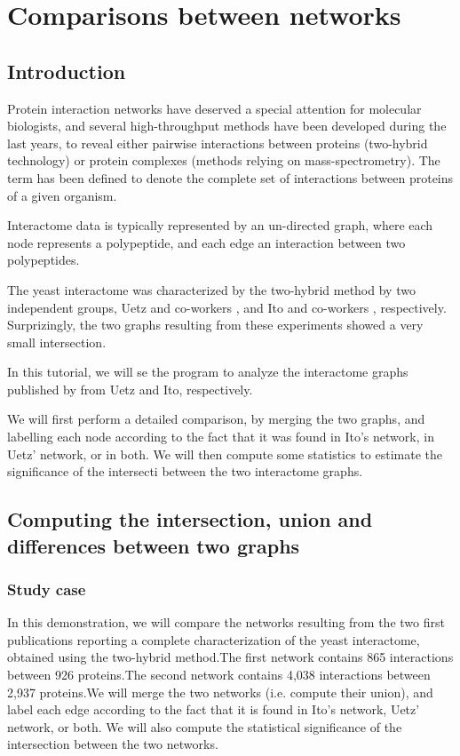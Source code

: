 \chapter{Comparisons between networks}

\section{Introduction}

Protein interaction networks have deserved a special attention for
molecular biologists, and several high-throughput methods have been
developed during the last years, to reveal either pairwise
interactions between proteins (two-hybrid technology) or protein
complexes (methods relying on mass-spectrometry). The term
 has been defined to denote the complete set of
interactions between proteins of a given organism.

Interactome data is typically represented by an un-directed graph,
where each node represents a polypeptide, and each edge an interaction
between two polypeptides.

The yeast interactome was characterized by the two-hybrid method by
two independent groups, Uetz and co-workers \cite{Uetz:2000}, and Ito
and co-workers \cite{Ito:2001}, respectively. Surprizingly, the two
graphs resulting from these experiments showed a very small
intersection.

In this tutorial, we will se the program  to
analyze the interactome graphs published by from Uetz and Ito,
respectively.

We will first perform a detailed comparison, by merging the two
graphs, and labelling each node according to the fact that it was
found in Ito's network, in Uetz' network, or in both. We will then
compute some statistics to estimate the significance of the intersecti
between the two interactome graphs.

\section{Computing the intersection, union and differences between two graphs}

\subsection{Study case}

In this demonstration, we will compare the networks resulting from the
two first publications reporting a complete characterization of the
yeast interactome, obtained using the two-hybrid method.The first
network \cite{Uetz:2000} contains 865 interactions between 926
proteins.The second network \cite{Ito:2001} contains 4,038
interactions between 2,937 proteins.We will merge the two networks
(i.e. compute their union), and label each edge according to the fact
that it is found in Ito's network, Uetz' network, or both. We will
also compute the statistical significance of the intersection between
the two networks.


